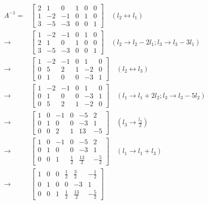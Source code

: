 \begin{align*}
    A^{-1} =& \left[\begin{array}{cccccc}
         2 & 1 & 0 & 1 & 0 & 0 \\
         1 & -2 & -1 & 0 & 1 & 0 \\
         3 & -5 & -3 & 0 & 0 & 1
    \end{array}\right] \quad (l_2 \leftrightarrow l_1) \\ \rightarrow
    &\left[\begin{array}{cccccc}
         1 & -2 & -1 & 0 & 1 & 0 \\
         2 & 1 & 0 & 1 & 0 & 0 \\
         3 & -5 & -3 & 0 & 0 & 1
    \end{array}\right] \quad (l_2 \rightarrow l_2 - 2l_1; l_3 \rightarrow l_3 - 3l_1) \\ \rightarrow
    &\left[\begin{array}{cccccc}
         1 & -2 & -1 & 0 & 1 & 0 \\
         0 & 5 & 2 & 1 & -2 & 0 \\
         0 & 1 & 0 & 0 & -3 & 1
    \end{array}\right] \quad(l_2 \leftrightarrow l_3) \\ \rightarrow
    &\left[\begin{array}{cccccc}
         1 & -2 & -1 & 0 & 1 & 0 \\
         0 & 1 & 0 & 0 & -3 & 1 \\
         0 & 5 & 2 & 1 & -2 & 0
    \end{array}\right] \quad (l_1 \rightarrow l_1 + 2l_2; l_3 \rightarrow l_3 - 5l_2) \\ \rightarrow
    &\left[\begin{array}{cccccc}
         1 & 0 & -1 & 0 & -5 & 2 \\
         0 & 1 & 0 & 0 & -3 & 1 \\
         0 & 0 & 2 & 1 & 13 & -5
    \end{array}\right] \quad (l_3 \rightarrow \frac{l_3}{2}) \\ \rightarrow
    &\left[\begin{array}{cccccc}
         1 & 0 & -1 & 0 & -5 & 2 \\
         0 & 1 & 0 & 0 & -3 & 1 \\
         0 & 0 & 1 & \frac{1}{2} & \frac{13}{2} & -\frac{5}{2}
    \end{array}\right] \quad (l_1 \rightarrow l_1 + l_3) \\ \rightarrow
    &\left[\begin{array}{cccccc}
         1 & 0 & 0 & \frac{1}{2} & \frac{3}{2} & -\frac{1}{2} \\
         0 & 1 & 0 & 0 & -3 & 1 \\
         0 & 0 & 1 & \frac{1}{2} & \frac{13}{2} & -\frac{5}{2}
    \end{array}\right]
\end{align*}
